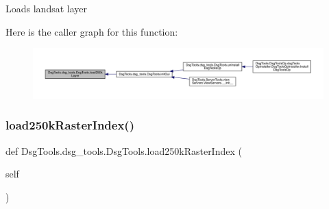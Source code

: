 \begin{DoxyVerb}Loads landsat layer
\end{DoxyVerb}
 Here is the caller graph for this function\+:
\nopagebreak
\begin{figure}[H]
\begin{center}
\leavevmode
\includegraphics[width=350pt]{class_dsg_tools_1_1dsg__tools_1_1_dsg_tools_ae2142392ed294e7274cbdbe1421c316c_icgraph}
\end{center}
\end{figure}
\mbox{\label{class_dsg_tools_1_1dsg__tools_1_1_dsg_tools_a1246a93b168ad0d4feb6a6dd4cbdb367}} 
\subsubsection{\texorpdfstring{load250k\+Raster\+Index()}{load250kRasterIndex()}}
{\footnotesize\ttfamily def Dsg\+Tools.\+dsg\+\_\+tools.\+Dsg\+Tools.\+load250k\+Raster\+Index (\begin{DoxyParamCaption}\item[{}]{self }\end{DoxyParamCaption})}

